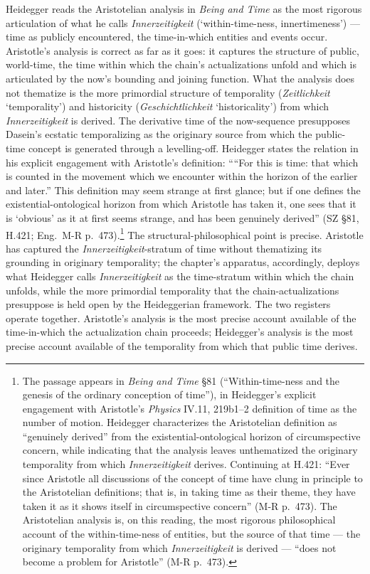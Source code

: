 \documentclass{article}
\begin{document}
Heidegger reads the Aristotelian analysis in \textit{Being and Time} as the most rigorous articulation of what he calls \textit{Innerzeitigkeit} (`within-time-ness, innertimeness') --- time as publicly encountered, the time-in-which entities and events occur. Aristotle's analysis is correct as far as it goes: it captures the structure of public, world-time, the time within which the chain's actualizations unfold and which is articulated by the now's bounding and joining function. What the analysis does not thematize is the more primordial structure of temporality (\textit{Zeitlichkeit} `temporality') and historicity (\textit{Geschichtlichkeit} `historicality') from which \textit{Innerzeitigkeit} is derived. The derivative time of the now-sequence presupposes Dasein's ecstatic temporalizing as the originary source from which the public-time concept is generated through a levelling-off. Heidegger states the relation in his explicit engagement with Aristotle's definition: ````For this is time: that which is counted in the movement which we encounter within the horizon of the earlier and later.'' This definition may seem strange at first glance; but if one defines the existential-ontological horizon from which Aristotle has taken it, one sees that it is `obvious' as it at first seems strange, and has been genuinely derived'' (SZ \S 81, H.421; Eng.~M-R p.~473).\footnote{The passage appears in \textit{Being and Time} \S 81 (``Within-time-ness and the genesis of the ordinary conception of time''), in Heidegger's explicit engagement with Aristotle's \textit{Physics} IV.11, 219b1--2 definition of time as the number of motion. Heidegger characterizes the Aristotelian definition as ``genuinely derived'' from the existential-ontological horizon of circumspective concern, while indicating that the analysis leaves unthematized the originary temporality from which \textit{Innerzeitigkeit} derives. Continuing at H.421: ``Ever since Aristotle all discussions of the concept of time have clung in principle to the Aristotelian definitions; that is, in taking time as their theme, they have taken it as it shows itself in circumspective concern'' (M-R p.~473). The Aristotelian analysis is, on this reading, the most rigorous philosophical account of the within-time-ness of entities, but the source of that time --- the originary temporality from which \textit{Innerzeitigkeit} is derived --- ``does not become a problem for Aristotle'' (M-R p.~473).} The structural-philosophical point is precise. Aristotle has captured the \textit{Innerzeitigkeit}-stratum of time without thematizing its grounding in originary temporality; the chapter's apparatus, accordingly, deploys what Heidegger calls \textit{Innerzeitigkeit} as the time-stratum within which the chain unfolds, while the more primordial temporality that the chain-actualizations presuppose is held open by the Heideggerian framework. The two registers operate together. Aristotle's analysis is the most precise account available of the time-in-which the actualization chain proceeds; Heidegger's analysis is the most precise account available of the temporality from which that public time derives.
\end{document}
